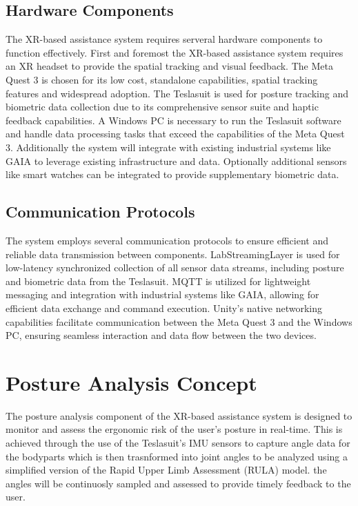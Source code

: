 \subsection{Hardware Components}
The XR-based assistance system requires serveral hardware components to function effectively. First and foremost the XR-based assistance system requires an XR headset to provide the spatial tracking and visual feedback. The Meta Quest 3 is chosen for its low cost, standalone capabilities, spatial tracking features and widespread adoption. The Teslasuit is used for posture tracking and biometric data collection due to its comprehensive sensor suite and haptic feedback capabilities. A Windows PC is necessary to run the Teslasuit software and handle data processing tasks that exceed the capabilities of the Meta Quest 3. Additionally the system will integrate with existing industrial systems like GAIA to leverage existing infrastructure and data. Optionally additional sensors like smart watches can be integrated to provide supplementary biometric data.

\subsection{Communication Protocols}
The system employs several communication protocols to ensure efficient and reliable data transmission between components.
LabStreamingLayer is used for low-latency synchronized collection of all sensor data streams, including posture and biometric data from the Teslasuit. MQTT is utilized for lightweight messaging and integration with industrial systems like GAIA, allowing for efficient data exchange and command execution. Unity's native networking capabilities facilitate communication between the Meta Quest 3 and the Windows PC, ensuring seamless interaction and data flow between the two devices.

\section{Posture Analysis Concept}
The posture analysis component of the XR-based assistance system is designed to monitor and assess the ergonomic risk of the user's posture in real-time. This is achieved through the use of the Teslasuit's IMU sensors to capture angle data for the bodyparts which is then trasnformed into joint angles to be analyzed using a simplified version of the Rapid Upper Limb Assessment (RULA) model. the angles will be continuosly sampled and assessed to provide timely feedback to the user.
